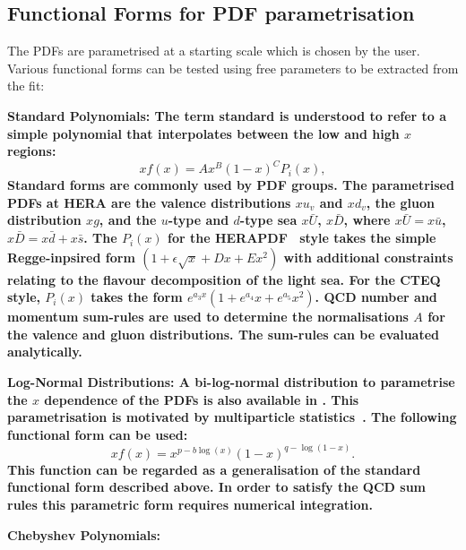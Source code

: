 \subsection{Functional Forms for PDF parametrisation}
The PDFs are parametrised at a starting scale which is chosen by the user. Various functional forms can be tested using free parameters to be extracted from the fit:
\begin{description}
\item \bf {Standard Polynomials:} \rm
The term standard is understood to refer to a simple polynomial 
that interpolates between the low and high $x$ regions:
\begin{equation}
 xf(x) = A x^{B} (1-x)^{C} P_i(x),
\label{eqn:pdf_std}
\end{equation}
Standard forms are commonly used by PDF groups.
The parametrised PDFs at HERA are the valence distributions
$xu_v$ and $xd_v$, the gluon distribution $xg$, and the $u$-type and $d$-type sea 
$x\bar{U}$, $x\bar{D}$, where $x\bar{U} = x\bar{u}$, 
$x\bar{D} = x\bar{d} +x\bar{s}$. 
The $P_i(x)$ for the HERAPDF~\cite{h1zeus:2009wt} style takes the simple Regge-inpsired form  
$(1 + \epsilon \sqrt{x} + D x + E x^2)$
with additional constraints relating to the flavour decomposition of the 
light sea. 
For the CTEQ style, $P_i(x)$ takes the form $e^{a_3x} (1 + e^{a_4} x + e^{a_5} x^2)$.
QCD number and momentum sum-rules are used to determine the normalisations $A$ for the valence and gluon distributions. 
The sum-rules can be evaluated analytically.

\item \bf {Log-Normal Distributions:} \rm
A bi-log-normal distribution to parametrise the $x$ dependence of the PDFs is 
also available in \fitter.
This parametrisation is motivated by  multiparticle statistics~\cite{hera-lhc:report2009}. 
The following functional form can be used:
\begin{equation}
 xf(x)=x^{p-b\log(x)}(1-x)^{q-\log(1-x)}.
\end{equation}
This function can be regarded as a generalisation of the standard functional form described above. 
In order to satisfy the QCD sum rules this parametric form requires numerical integration.

\item \bf {Chebyshev Polynomials:} \rm


\end{description}
